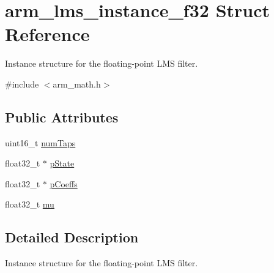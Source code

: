 \hypertarget{structarm__lms__instance__f32}{\section{arm\-\_\-lms\-\_\-instance\-\_\-f32 Struct Reference}
\label{structarm__lms__instance__f32}
}


Instance structure for the floating-\/point L\-M\-S filter.  




{\ttfamily \#include $<$arm\-\_\-math.\-h$>$}

\subsection*{Public Attributes}
\begin{DoxyCompactItemize}
\item 
uint16\-\_\-t \hyperlink{structarm__lms__instance__f32_af73880d9009982f5d14529869494ec3d}{num\-Taps}
\item 
float32\-\_\-t $\ast$ \hyperlink{structarm__lms__instance__f32_aaf94285be2f99b5b9af40bea8dcb14b9}{p\-State}
\item 
float32\-\_\-t $\ast$ \hyperlink{structarm__lms__instance__f32_a4795c6f7d3f17cec15c2fd09f66edd1a}{p\-Coeffs}
\item 
float32\-\_\-t \hyperlink{structarm__lms__instance__f32_ae2af43d74c93dba16b876e10c97a5b99}{mu}
\end{DoxyCompactItemize}


\subsection{Detailed Description}
Instance structure for the floating-\/point L\-M\-S filter. 

